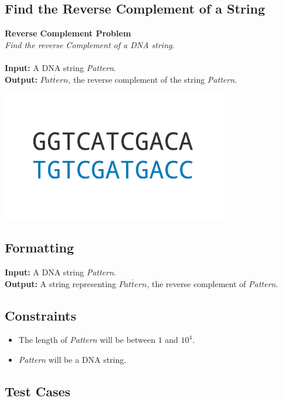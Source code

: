 \documentclass{article}
\begin{document}
\subsection{Find the Reverse Complement of a String}
\hline\vspace{5}
\noindent \textbf{Reverse Complement Problem}\\
\emph{Find the reverse Complement of a DNA string}.\\ \\
\textbf{Input:} A DNA string \emph{Pattern}.\\
\textbf{Output:} $\overline{Pattern}$, the reverse complement of the string \emph{Pattern}.
\begin{center}
    \includegraphics[scale=0.32]{c1/logos/1C.png} 
\end{center}
\hline\vspace{5}

\subsection*{Formatting}
\textbf{Input:} A DNA string \emph{Pattern}.\\
\noindent \textbf{Output:} A string representing $\overline{Pattern}$, the reverse complement of \emph{Pattern}.

\subsection*{Constraints}
\begin{itemize}
    \item The length of \emph{Pattern} will be between $1$ and $10^4$.
    \item \emph{Pattern} will be a DNA string.
\end{itemize}
\pagebreak

\subsection*{Test Cases}
\end{document}
